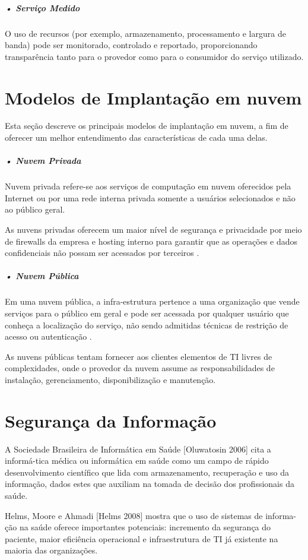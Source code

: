 \documentclass[portuguese,oneside]{tcc}
\begin{document}
\subparagraph{• Serviço Medido}
O uso de recursos (por exemplo, armazenamento, processamento e largura de banda) pode ser monitorado, controlado e reportado, proporcionando transparência tanto para o provedor como para o consumidor do serviço utilizado.

\section{Modelos de Implantação em nuvem}
Esta seção descreve os principais modelos de implantação em nuvem, a fim de oferecer um melhor entendimento das características de cada uma delas. 

\subparagraph{• Nuvem Privada}
Nuvem privada refere-se aos serviços de computação em nuvem oferecidos pela Internet ou por uma rede interna privada somente a usuários selecionados e não ao público geral.

As nuvens privadas oferecem um maior nível de segurança e privacidade por meio de firewalls da empresa e hosting interno para garantir que as operações e dados confidenciais não possam ser acessados por terceiros \cite{OQUEENUVEM}.

\subparagraph{• Nuvem Pública}
Em uma nuvem pública, a infra-estrutura pertence a uma  organização que vende serviços para o público em geral e pode  ser acessada por qualquer usuário que conheça a localização do  serviço, não sendo admitidas técnicas de restrição de acesso ou autenticação \cite{COMPUTACAOEMNUVEM}.

As nuvens públicas tentam fornecer aos clientes elementos de  TI livres de complexidades, onde o provedor da nuvem assume  as responsabilidades de instalação, gerenciamento, disponibilização e manutenção.  

\section{Segurança da Informação}
A Sociedade Brasileira de Informática em Saúde [Oluwatosin 2006] cita a informá-tica médica ou informática em saúde como um campo de rápido desenvolvimento científico que lida com armazenamento, recuperação e uso da informação, dados estes que auxiliam na tomada de decisão dos profissionais da saúde.

Helms, Moore e Ahmadi [Helms 2008] mostra que o uso de sistemas de informa-ção na saúde oferece importantes potenciais: incremento da segurança do paciente, maior eficiência operacional e infraestrutura de TI já existente na maioria das organizações.
\end{document}
